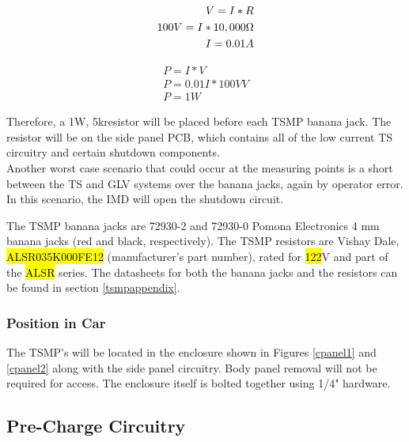\documentclass{article}
\DeclareRobustCommand{\hlr}[1]{{\sethlcolor{red}\hl{#1}}}
\begin{document}
            \begin{align}
                V = I * R \\
                100 V = I * 10,000 \ohm \\
                I = 0.01A
            \end{align}

            \begin{align}
                P = I * V \\
                P = 0.01 I * 100V V \\
                P = 1 W
            \end{align}

            Therefore, a 1W, 5k\ohm resistor will be placed before each TSMP banana jack. The resistor will be on the side panel PCB, which contains all of the low current TS circuitry and certain shutdown components. \\

            Another worst case scenario that could occur at the measuring points is a short between the TS and GLV systems over the banana jacks, again by operator error. In this scenario, the IMD will open the shutdown circuit.

            The TSMP banana jacks are 72930-2 and 72930-0 Pomona Electronics 4 mm banana jacks (red and black, respectively). The TSMP resistors are Vishay Dale, \hlr{ALSR035K000FE12}  (manufacturer's part number), rated for \hlr{122}V and part of the \hlr{ALSR} series. The datasheets for both the banana jacks and the resistors can be found in section \ref{tsmpappendix}.


        \subsubsection{Position in Car}

            The TSMP's will be located in the enclosure shown in Figures \ref{cpanel1} and \ref{cpanel2} along with the side panel circuitry. Body panel removal will not be required for access. The enclosure itself is bolted together using 1/4" hardware.

    \subsection{Pre-Charge Circuitry}
\end{document}
